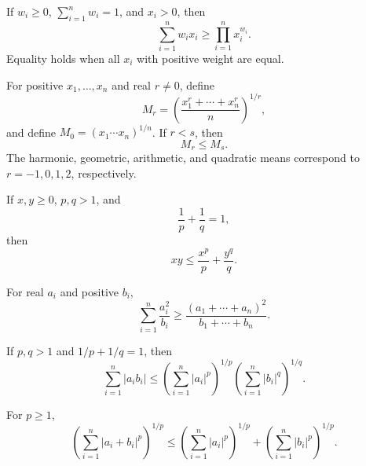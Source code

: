     \begin{theorem}
        If $w_i\geq0$, $\sum_{i=1}^{n}w_i=1$, and $x_i>0$, then
        \[
            \sum_{i=1}^{n}w_ix_i
            \geq
            \prod_{i=1}^{n}x_i^{w_i}.
        \]
        Equality holds when all $x_i$ with positive weight are equal.
    \end{theorem}

    \begin{theorem}
        For positive $x_1,\dots,x_n$ and real $r\neq0$, define
        \[
            M_r
            =
            \left(
                \frac{x_1^r+\cdots+x_n^r}{n}
            \right)^{1/r},
        \]
        and define $M_0=(x_1\cdots x_n)^{1/n}$. If $r<s$, then
        \[
            M_r\leq M_s.
        \]
        The harmonic, geometric, arithmetic, and quadratic means correspond to
        $r=-1,0,1,2$, respectively.
    \end{theorem}

    \begin{theorem}
        If $x,y\geq0$, $p,q>1$, and
        \[
            \frac1p+\frac1q=1,
        \]
        then
        \[
            xy\leq\frac{x^p}{p}+\frac{y^q}{q}.
        \]
    \end{theorem}

    \begin{theorem}
        For real $a_i$ and positive $b_i$,
        \[
            \sum_{i=1}^{n}\frac{a_i^2}{b_i}
            \geq
            \frac{(a_1+\cdots+a_n)^2}{b_1+\cdots+b_n}.
        \]
    \end{theorem}

    \begin{theorem}
        If $p,q>1$ and $1/p+1/q=1$, then
        \[
            \sum_{i=1}^{n}|a_ib_i|
            \leq
            \left(\sum_{i=1}^{n}|a_i|^p\right)^{1/p}
            \left(\sum_{i=1}^{n}|b_i|^q\right)^{1/q}.
        \]
    \end{theorem}

    \begin{theorem}
        For $p\geq1$,
        \[
            \left(\sum_{i=1}^{n}|a_i+b_i|^p\right)^{1/p}
            \leq
            \left(\sum_{i=1}^{n}|a_i|^p\right)^{1/p}
            +
            \left(\sum_{i=1}^{n}|b_i|^p\right)^{1/p}.
        \]
    \end{theorem}

